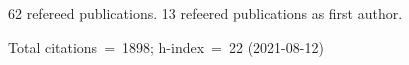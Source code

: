 62 refereed publications. 13 refeered publications as first author.

Total citations~=~1898; h-index~=~22 (2021-08-12)